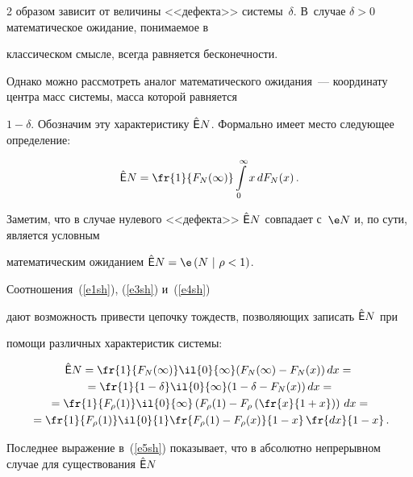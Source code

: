 \begin{multicols}{2}
образом зависит от величины <<дефекта>> системы~$\delta$. В~случае $\delta>0$ математическое ожидание, понимаемое в


классическом смысле, всегда равняется бесконечности.





Однако можно рассмотреть аналог математического ожидания~--- координату центра масс системы, масса которой равняется


$1-\delta$. Обозначим эту характеристику $\hat{\sf E}N$. Формально имеет место следующее определение:


$$


\hat{\sf E} N=\fr{1}{F_N(\infty)}\int\limits_{0}^{\infty}x\, dF_N(x)\,.


$$





Заметим, что в случае нулевого <<дефекта>> $\hat{\sf E}N$ совпадает с~$\e N$ и, по сути, является условным


математическим ожиданием $\hat{\sf E}N=\e\left(N\ |\ \rho<1\right)$.





Соотношения~(\ref{e1sh}), (\ref{e3sh}) и~(\ref{e4sh}) 


дают возможность привести цепочку тождеств, позволяющих записать $\hat{\sf E}N$ при


помощи различных характеристик системы:


\begin{multline}


\hat{\sf E}N=\fr{1}{F_N(\infty)}\il{0}{\infty}(F_N(\infty)-F_N(x))\, dx={}\\


{}=\fr{1}{1-\delta}\il{0}{\infty}(1-\delta-F_N(x))\, dx={}\\


{}=\fr{1}{F_\rho(1)}\il{0}{\infty}\left(F_\rho(1)-F_\rho\left(\fr{x}{1+x}\right)\right)\, dx={}\\


{}


=\fr{1}{F_\rho(1)}\il{0}{1} \fr{F_\rho(1)-F_\rho(x)}{1-x}\, \fr{dx}{1-x}\,.


\label{e5sh}


\end{multline}





Последнее выражение в~(\ref{e5sh}) показывает, что в абсолютно непрерывном случае для существования $\hat{\sf E}N$



\end{multicols}
